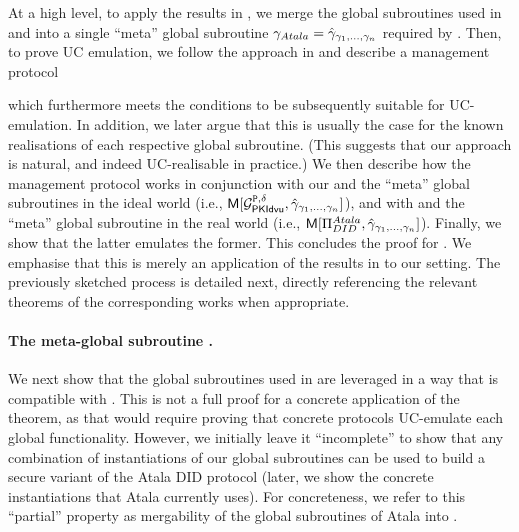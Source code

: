 At a high level, to apply the results in \cite{bch+20,bhz21}, we merge the
global subroutines used in \IdealGPKIDID and \RealPKIDIDAtala into a single
``meta'' global subroutine $\gamma_{Atala} = \hat{\gamma}_{\gamma_1,\dots,\gamma_n}$
required by .
%
Then, to prove UC emulation, we follow the approach in \cite{bch+20} and
describe a management protocol \UCM

which furthermore meets the conditions to be
subsequently suitable for UC-emulation. In addition, we later argue that this is
usually the case for the known realisations of each respective global
subroutine. (This suggests that our approach is natural, and indeed
UC-realisable in practice.)
%
We then describe how the management protocol \UCM works in conjunction with
our \IdealGPKIDID and the ``meta'' global subroutines in the ideal world (i.e.,
$\mathsf{M}[\mathcal{G}^{\mathtt{P},\delta}_{\mathsf{PKIdvu}},\hat{\gamma}_{\gamma_1,\dots,\gamma_n}]$), and
with \RealPKIDIDAtala and the ``meta'' global subroutine in the real world
(i.e., $\mathsf{M}[\Pi_{DID}^{Atala},\hat{\gamma}_{\gamma_1,\dots,\gamma_n}]$).
%
Finally, we show that the latter emulates the former. This concludes the proof
for .
%
We emphasise that this is merely an application of the results in
\cite{bch+20,bhz21} to our setting. The previously sketched process is detailed
next, directly referencing the relevant theorems of the corresponding works when
appropriate.

\paragraph{The meta-global subroutine \gAtala.} %
We next show that the global subroutines used in \RealPKIDIDAtala are leveraged
in a way that is compatible with \cite[Theorem 4.3]{bhz21}. This is not a full
proof for a concrete application of the theorem, as that would require proving
that concrete protocols UC-emulate each global functionality. However, we
initially leave it ``incomplete'' to show that any combination of instantiations
of our global subroutines can be used to build a secure variant of the Atala
DID protocol (later, we show the concrete instantiations that Atala currently
uses). For concreteness, we refer to this ``partial'' property as mergability
of the global subroutines of Atala into \gAtala.

